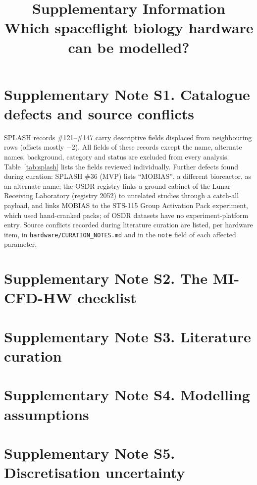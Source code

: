 \documentclass[11pt]{article}
\title{Supplementary Information\\\large Which spaceflight biology hardware can be modelled?}
\date{}
\begin{document}
\maketitle

\FloatBarrier
\section*{Supplementary Note S1. Catalogue defects and source conflicts}
SPLASH records \#121--\#147 carry descriptive fields displaced from neighbouring rows (offsets mostly $-2$).
All fields of these records except the name, alternate names, background, category and status are excluded
from every analysis. Table~\ref{tab:splash} lists the fields reviewed individually. Further defects found
during curation: SPLASH \#36 (MVP) lists ``MOBIAS'', a different bioreactor, as an alternate name; the OSDR
registry links a ground cabinet of the Lunar Receiving Laboratory (registry 2052) to \hwNCatchallStudies{} unrelated studies
through a catch-all payload, and links MOBIAS to the STS-115 Group Activation Pack experiment, which used
hand-cranked packs; \hwNDatasetsNoPlatform{} of \hwNDatasets{} OSDR datasets have no experiment-platform
entry. Source conflicts recorded during literature curation are listed, per hardware item, in
\texttt{hardware/CURATION\_NOTES.md} and in the \texttt{note} field of each affected parameter.



\FloatBarrier
\section*{Supplementary Note S2. The MI-CFD-HW checklist}


\FloatBarrier
\section*{Supplementary Note S3. Literature curation}


\FloatBarrier
\section*{Supplementary Note S4. Modelling assumptions}


\FloatBarrier
\section*{Supplementary Note S5. Discretisation uncertainty}

\end{document}
